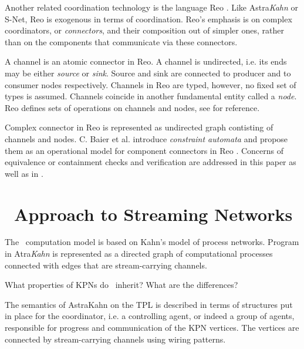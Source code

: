 Another related coordination technology is the language Reo \cite{Reo_Arbab04}. Like Astra\emph{Kahn} or S-Net, Reo is exogenous in terms of coordination. Reo's emphasis is on complex coordinators, or \emph{connectors}, and their composition out of simpler ones, rather than on the components that communicate via these connectors.

A channel is an atomic connector in Reo. A channel is undirected, i.e. its ends may be either \emph{source} or \emph{sink}. Source and sink are connected to producer and to consumer nodes respectively. Channels in Reo are typed, however, no fixed set of types is assumed. Channels coincide in another fundamental entity called a \emph{node}. Reo defines sets of operations on channels and nodes, see \cite{Reo_Arbab04} for reference.

Complex connector in Reo is represented as undirected graph contisting of channels and nodes. C. Baier et al. introduce \emph{constraint automata} and propose them as an operational model for component connectors in Reo \cite{baier_ca}. Concerns of equivalence or containment checks and verification are addressed in this paper as well as in \cite{Pourvatan}.


    \section{\ak\ Approach to Streaming Networks}
The \ak\ computation model is based on Kahn's model of process networks. Program in Atra\emph{Kahn} is represented as a directed graph of computational processes connected with edges that are stream-carrying channels.

What properties of KPNs do \ak\ inherit? What are the differences?


The semantics of AstraKahn on the TPL is described in terms of structures put in place for the coordinator, i.e. a controlling agent, or indeed a group of agents, responsible for progress and communication of the KPN vertices. The vertices are connected by stream-carrying channels using wiring patterns.


